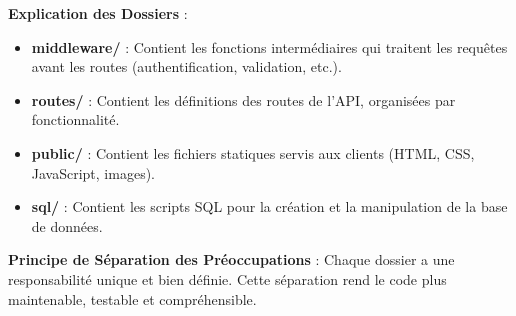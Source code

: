 \documentclass[a4paper,12pt]{book}
\begin{document}
\begin{architecturebox}
    \textbf{Explication des Dossiers} :
    \begin{itemize}
        \item \textbf{middleware/} : Contient les fonctions intermédiaires qui traitent les requêtes avant les routes (authentification, validation, etc.).
        \item \textbf{routes/} : Contient les définitions des routes de l'API, organisées par fonctionnalité.
        \item \textbf{public/} : Contient les fichiers statiques servis aux clients (HTML, CSS, JavaScript, images).
        \item \textbf{sql/} : Contient les scripts SQL pour la création et la manipulation de la base de données.
    \end{itemize}
\end{architecturebox}

\begin{bestpracticebox}
    \textbf{Principe de Séparation des Préoccupations} :
    Chaque dossier a une responsabilité unique et bien définie. Cette séparation rend le code plus maintenable, testable et compréhensible.
\end{bestpracticebox}
\end{document}
